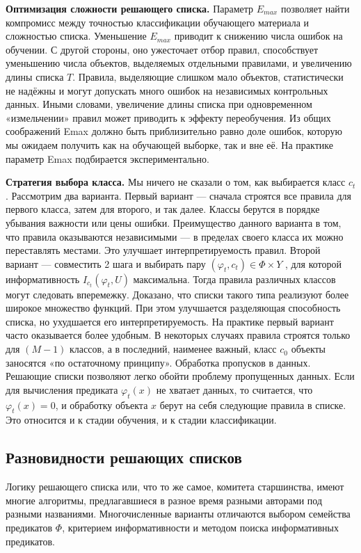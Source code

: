 \textbf{Оптимизация сложности решающего списка.} Параметр $E_{max}$ позволяет найти
компромисс между точностью классификации обучающего материала и сложностью
списка. Уменьшение $E_{max}$ приводит к снижению числа ошибок на обучении. С другой
стороны, оно ужесточает отбор правил, способствует уменьшению числа объектов,
выделяемых отдельными правилами, и увеличению длины списка $T$. Правила, выделяющие слишком мало объектов, статистически не надёжны и могут допускать много
ошибок на независимых контрольных данных. Иными словами, увеличение длины
списка при одновременном «измельчении» правил может приводить к эффекту переобучения. Из общих соображений Emax должно быть приблизительно равно доле
ошибок, которую мы ожидаем получить как на обучающей выборке, так и вне её.
На практике параметр Emax подбирается экспериментально.

\textbf{Стратегия выбора класса.} Мы ничего не сказали о том, как выбирается класс $c_t$. Рассмотрим два варианта.
Первый вариант — сначала строятся все правила для первого класса, затем для второго, и так далее. Классы берутся в порядке убывания важности или цены ошибки. Преимущество данного варианта в том, что правила оказываются независимыми — в пределах своего класса их можно переставлять местами. Это улучшает
интерпретируемость правил.
Второй вариант — совместить 2 шага и выбирать пару $(\varphi_t
, c_t) \in \Phi \times Y$ , для
которой информативность $I_{c_t}(\varphi_t, U)$ максимальна. Тогда правила различных классов
могут следовать вперемежку. Доказано, что списки такого типа реализуют более широкое множество функций. При этом улучшается разделяющая способность
списка, но ухудшается его интерпретируемость.
На практике первый вариант часто оказывается более удобным. В некоторых случаях правила строятся только для $(M − 1)$ классов, а в последний, наименее
важный, класс $c_0$ объекты заносятся «по остаточному принципу».
Обработка пропусков в данных. Решающие списки позволяют легко обойти проблему пропущенных данных. Если для вычисления предиката 
$\varphi_t(x)$ не хватает данных, то считается, что $\varphi_t(x) = 0$, и обработку объекта $x$ берут на себя следующие
правила в списке. Это относится и к стадии обучения, и к стадии классификации.

\subsection{Разновидности решающих списков}
Логику решающего списка или, что то же самое, комитета старшинства, имеют
многие алгоритмы, предлагавшиеся в разное время разными авторами под разными названиями. Многочисленные варианты отличаются выбором семейства предикатов $\Phi$, критерием информативности и методом поиска информативных предикатов.

